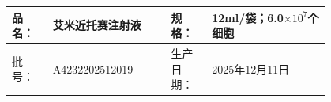 \documentclass[UTF8,10pt,a4paper,fontset=fandol]{ctexart}
\newcommand{\fieldvalue}[1]{#1}
\begin{document}
\begin{center}
\small
\begin{tabular}{|p{0.10\linewidth}|p{0.30\linewidth}|p{0.10\linewidth}|p{0.30\linewidth}|}
\hline
品名：
&
\fieldvalue{艾米近托赛注射液}
&
规格：
&
\fieldvalue{12ml/袋；6.0$\times 10^{7}$个细胞}
\\ \hline
批号：
&
\fieldvalue{A4232202512019}
&
生产日期：
&
\fieldvalue{2025年12月11日}
\\ \hline
\end{tabular}

\vspace{2pt}


\end{center}
\end{document}
